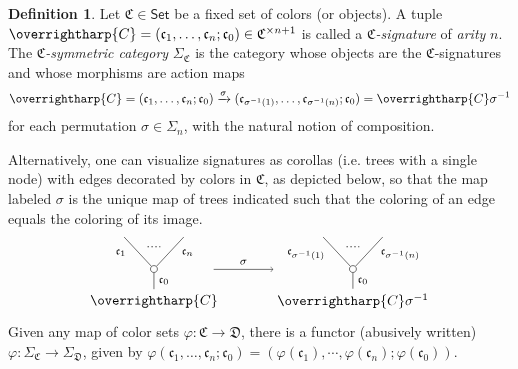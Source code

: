 \documentclass[a4paper,10pt
,draft
]{article}%
\numberwithin{equation}{section}
\numberwithin{figure}{section}
\theoremstyle{definition} %
\newtheorem{definition}[equation]{Definition}%
\newcommand{\vect}[1]{\text{\overrightharp{\ensuremath{#1}}}}
\newcommand{\1}{\ensuremath{\mathbbm 1}}%
\begin{document}
\begin{definition}\label{CSYM DEF}
	Let $\mathfrak {C} \in \mathsf{Set}$ be a fixed set of colors (or objects).
	A tuple
	$\vect C = (\mathfrak c_1, \dots, \mathfrak c_n; \mathfrak c_0) \in \mathfrak{C}^{\times n+1}$
	is called a \textit{$\mathfrak {C}$-signature} of \textit{arity} $n$.
	The \textit{$\mathfrak C$-symmetric category} $\Sigma_{\mathfrak C}$ is the category whose objects are the $\mathfrak{C}$-signatures and 
	whose morphisms are action maps
	\begin{equation}\label{CSYM EQ1}
	\vect{C} =
	(\mathfrak c_1, \dots, \mathfrak c_n; \mathfrak c_0) \xrightarrow{\sigma} (\mathfrak c_{\sigma^{-1}(1)}, \dots, \mathfrak c_{\sigma^{-1}(n)}; \mathfrak c_0)
	= \vect{C} \sigma^{-1}
	\end{equation}
	for each permutation $\sigma \in \Sigma_n$, with the natural notion of composition.
	
	Alternatively, one can visualize signatures as corollas (i.e. trees with a single node)
	with edges decorated by colors in $\mathfrak{C}$, as depicted below, so that the map labeled $\sigma$
	is the unique map of trees indicated such that the coloring of an edge equals the coloring of its image.
	\begin{equation}\label{CSYM EQ2}
	\begin{tikzpicture}
	[grow=up,auto,level distance=2.3em,every node/.style = {font=\footnotesize},dummy/.style={circle,draw,inner sep=0pt,minimum size=1.75mm}]
	
	\node at (0,0) [font=\normalsize]{$\vect{C}$}
	child{node [dummy] {}
		child{
			edge from parent node [swap,near end] {$\mathfrak c_n$} node [name=Kn] {}}
		child{
			edge from parent node [near end] {$\mathfrak c_1$}
			node [name=Kone,swap] {}}
		edge from parent node [swap] {$\mathfrak c_0$}
	};
	\draw [dotted,thick] (Kone) -- (Kn) ;
	\node at (5,0) [font=\normalsize] {$\vect{C} \sigma^{-1}
		$}
	child{node [dummy] {}
		child{
			edge from parent node [swap,near end] {$\mathfrak c_{\sigma^{-1}(n)}$} node [name=Kn] {}}
		child{
			edge from parent node [near end] {$\mathfrak c_{\sigma^{-1}(1)}$}
			node [name=Kone,swap] {}}
		edge from parent node [swap] {$\mathfrak c_0$}
	};
	\draw [dotted,thick] (Kone) -- (Kn) ;
	
	\draw[->] (1.5,0.8) -- node{$\sigma$} (3,0.8);
	\end{tikzpicture}
	\end{equation}
	Given any map of color sets $\varphi \colon \mathfrak{C} \to \mathfrak{D}$,
	there is a functor (abusively written)
	$\varphi \colon \Sigma_{\mathfrak{C}} \to \Sigma_{\mathfrak{D}}$,
	given by 
	$\varphi (\mathfrak c_1, \dots, \mathfrak c_n; \mathfrak c_0) = (\varphi(\mathfrak c_1),\cdots,\varphi(\mathfrak c_n);\varphi(\mathfrak c_0))$. 
\end{definition}
\end{document}
